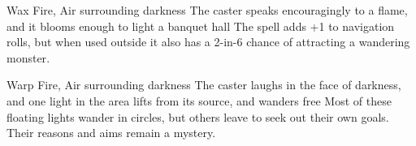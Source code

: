 \ifodd\value{diceNo}

  {}%
  {Wax}%
  {Fire, Air}%
  {surrounding darkness}%
  {The caster speaks encouragingly to a flame, and it blooms enough to light a banquet hall}%
  {The spell adds +1 to \gls{navigation} rolls, but when used outside it also has a 2-in-6 chance of attracting a wandering \gls{monster}.}

\else

  {}%
  {Warp}%
  {Fire, Air}%
  {surrounding darkness}%
  {The caster laughs in the face of darkness, and one light in the area lifts from its source, and wanders free}%
  {Most of these floating lights wander in circles, but others leave to seek out their own goals.
  Their reasons and aims remain a mystery.}

\fi
{}
